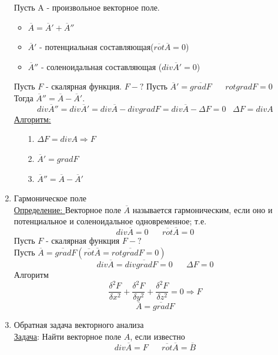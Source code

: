 \documentclass[12pt]{article}
\begin{document}
\begin{enumerate}
    Пусть A - произвольное векторное поле.
    \begin{itemize}
      \item $\overline{A}=\overline{A}'+\overline{A}''$
      \item $\overline{A}'$ - потенциальная составляющая($\overline{rot}\overline{A}=0$)
      \item $\overline{A}''$ - соленоидальная составляющая ($div \overline{A}'=0$)
    \end{itemize}
    Пусть $F$ - скалярная функция. \hspace{20pt} $F-?$ \hspace{10pt} Пусть $\overline{A}' = \overline{gradF} \hspace{20pt} rotgradF=0$\\
    Тогда $\overline{A}'' = \overline{A}-\overline{A}'$.
    \[div \overline{A}'' = div\overline{A}' = div \overline{A}-divgradF=div \overline{A}-\Delta F=0 \hspace{10pt} \Delta F=divA\]
    \clearpage
    \underline{Алгоритм:}
    \begin{enumerate}
      \item[1.] $\Delta F = divA \Rightarrow F$
      \item[2.] $\overline{A}' = gradF$
      \item[3.] $\overline{A}'' = \overline{A} - \overline{A}'$
    \end{enumerate}
    \item Гармоническое поле\\
    \underline{Определение: } Векторное поле $\overline{A}$ называется гармоническим, если оно и потенциальное и
    соленоидальное одновременное; т.е.
    \[div \overline{A} = 0 \hspace{20pt} \overline{rot}\overline{A}=0\]
    Пусть $F$ - скалярная функция \hspace{20pt} $F-?$\\
    Пусть $\overline{A} = \overline{grad}F(\overline{rot}\overline{A}=rot\overline{grad}F=0)$
    \[div \overline{A} = div\overline{grad}F=0 \hspace{20pt} \Delta F=0\]
    Алгоритм
    \[\frac{\delta^2 F}{\delta x^2}+\frac{\delta^2 F}{\delta y^2}+\frac{\delta^2 F}{\delta z^2} = 0 \Rightarrow F\]
    \[\overline{A}=\overline{grad}F\]
    \item Обратная задача векторного анализа\\
    \underline{Задача}: Найти векторное поле $A$, если известно
    \[div \overline{A} = F \hspace{20pt} \overline{rot}\overline{A}=\overline{B}\]

\end{enumerate}
\end{document}
